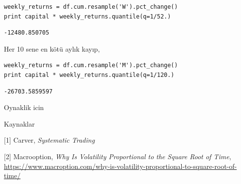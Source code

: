 \documentclass[12pt,fleqn]{article}\usepackage{../../common}
\begin{document}
\begin{verbatim}
weekly_returns = df.cum.resample('W').pct_change()
print capital * weekly_returns.quantile(q=1/52.)
\end{verbatim}

\begin{verbatim}
-12480.850705
\end{verbatim}

Her 10 sene en kötü aylık kayıp,

\begin{verbatim}
weekly_returns = df.cum.resample('M').pct_change()
print capital * weekly_returns.quantile(q=1/120.)
\end{verbatim}

\begin{verbatim}
-26703.5859597
\end{verbatim}

Oynaklik icin 

Kaynaklar

[1] Carver, {\em Systematic Trading}

[2] Macrooption, {\em Why Is Volatility Proportional to the Square Root of  Time},
    \url{https://www.macroption.com/why-is-volatility-proportional-to-square-root-of-time/}
\end{document}
